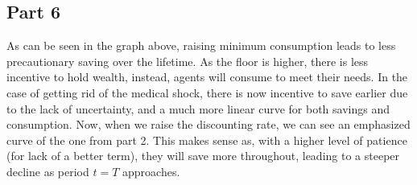 \documentclass[10pt,a4paper]{article}
\begin{document}
\subsection*{Part 6}


As can be seen in the graph above, raising minimum consumption leads to less precautionary saving over the lifetime. As the floor is higher, there is less incentive to hold wealth, instead, agents will consume to meet their needs. In the case of getting rid of the medical shock, there is now incentive to save earlier due to the lack of uncertainty, and a much more linear curve for both savings and consumption. Now, when we raise the discounting rate, we can see an emphasized curve of the one from part 2. This makes sense as, with a higher level of patience (for lack of a better term), they will save more throughout, leading to a steeper decline as period $t=T$ approaches. 
\end{document}
